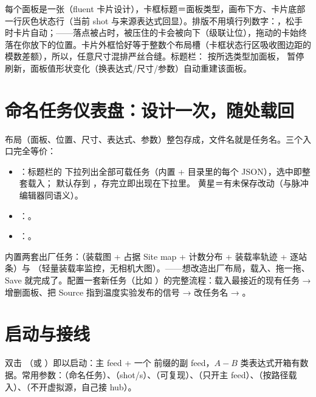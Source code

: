 \documentclass[11pt,oneside,openany]{book}
\begin{document}
每个面板是一张（fluent 卡片设计），卡框标题＝面板类型，画布下方、卡片底部一行灰色状态行（当前 shot 与来源表达式回显）。排版不用填行列数字：，松手时卡片自动；——落点被占时，被压住的卡会被向下（级联让位），拖动的卡始终落在你放下的位置。卡片外框恰好等于整数个布局槽（卡框状态行区吸收图边距的模数差额），所以，任意尺寸混排严丝合缝。标题栏： 按所选类型加面板， 暂停刷新，面板值形状变化（换表达式/尺寸/参数）自动重建该面板。

\section{命名任务仪表盘：设计一次，随处载回}
布局（面板、位置、尺寸、表达式、参数）整包存成，文件名就是任务名。三个入口完全等价：
\begin{itemize}
  \item {}：标题栏的  下拉列出全部可载任务（内置 +  目录里的每个 JSON），选中即整套载入； 默认存到 ，存完立即出现在下拉里。 黄星＝有未保存改动（与脉冲编辑器同语义）。
  \item {}：。
  \item {}：。
\end{itemize}
内置两套出厂任务：（装载图 + 占据 Site map + 计数分布 + 装载率轨迹 + 逐站条）与 （轻量装载率监控，无相机大图）。——想改造出厂布局，载入、拖一拖、Save 就完成了。配置一套新任务（比如 ）的完整流程：载入最接近的现有任务 → 增删面板、把 Source 指到温度实验发布的信号 → 改任务名 → 。

\section{启动与接线}
双击 （或 ）即以启动：主 feed + 一个  前缀的副 feed，$A-B$ 类表达式开箱有数据。常用参数：（命名任务）、（shot/s）、（可复现）、（只开主 feed）、（按路径载入）、（不开虚拟源，自己接 hub）。
\end{document}
